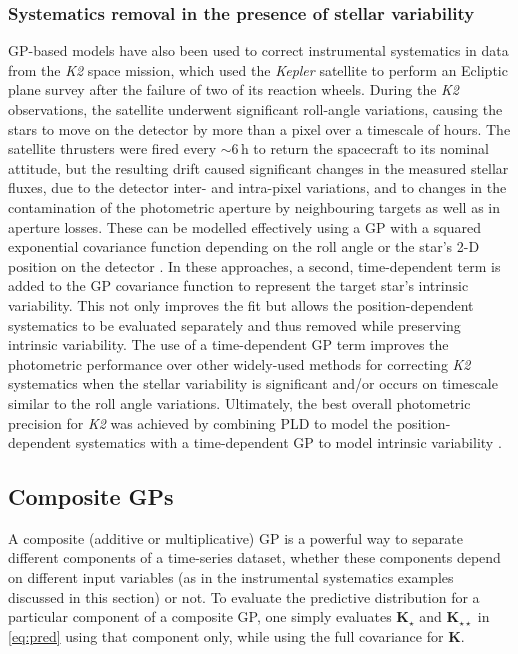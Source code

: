 \documentclass[letterpaper]{ar-1col}
\begin{document}
\subsubsection{Systematics removal in the presence of stellar variability}
GP-based models have also been used to correct instrumental systematics in data from the \textit{K2} space mission, which used the \textit{Kepler} satellite to perform an Ecliptic plane survey after the failure of two of its reaction wheels. During the \textit{K2} observations, the satellite underwent significant roll-angle variations, causing the stars to move on the detector by more than a pixel over a timescale of hours. The satellite thrusters were fired every $\sim 6$\,h to return the spacecraft to its nominal attitude, but the resulting drift caused significant changes in the measured stellar fluxes, due to the detector inter- and intra-pixel variations, and to changes in the contamination of the photometric aperture by neighbouring targets as well as in aperture losses. These can be modelled effectively using a GP with a squared exponential covariance function depending on the roll angle \citep{2015MNRAS.447.2880A, 2016ApJS..226....7C} or the star's 2-D position on the detector \citep{2016MNRAS.459.2408A}. In these approaches, a second, time-dependent term is added to the GP covariance function to represent the target star's intrinsic variability. This not only improves the fit but allows the position-dependent systematics to be evaluated separately and thus removed while preserving intrinsic variability. The use of a time-dependent GP term improves the photometric performance over other widely-used methods for correcting \textit{K2} systematics \citep[e.g.,][]{2014PASP..126..948V} when the stellar variability is significant and/or occurs on timescale similar to the roll angle variations. Ultimately, the best overall photometric precision for \textit{K2} was achieved by combining PLD to model the position-dependent systematics with a time-dependent GP to model intrinsic variability \citep{everest1,everest2}.

\begin{textbox}[ht]
\section{Composite GPs}
A composite (additive or multiplicative) GP is a powerful way to separate different components of a time-series dataset, whether these components depend on different input variables (as in the instrumental systematics examples discussed in this section) or not. To evaluate the predictive distribution for a particular component of a composite GP, one simply evaluates $\mathbf{K}_\star$ and $\mathbf{K}_{\star\star}$ in \autoref{eq:pred} using that component only, while using the full covariance for $\mathbf{K}$.
\end{textbox}
\end{document}
